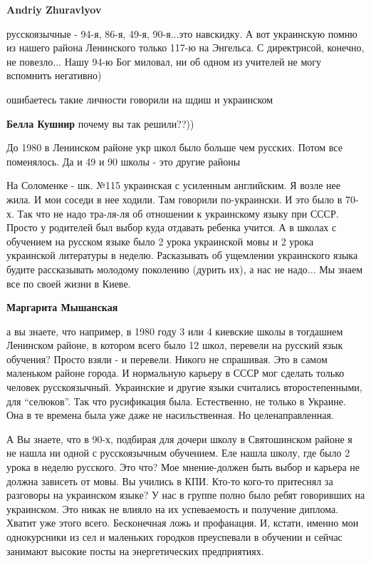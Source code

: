 \begin{itemize}
\begin{itemize}
\begin{itemize}
\textbf{Andriy Zhuravlyov} 

русскоязычные - 94-я, 86-я, 49-я, 90-я...это навскидку. А вот украинскую помню
из нашего района Ленинского только 117-ю на Энгельса. С директрисой, конечно,
не повезло... Нашу 94-ю Бог миловал, ни об одном из учителей не могу вспомнить
негативно)

\end{itemize} %

ошибаетесь такие личности говорили на шдиш и украинском

\textbf{Белла Кушнир} почему вы так решили??))


До 1980 в Ленинском районе укр школ было больше чем русских. Потом все
поменялось. Да и 49 и 90 школы - это другие районы



На Соломенке - шк. №115 украинская с усиленным английским. Я возле нее жила. И мои
соседи в нее ходили. Там говорили по-украински. И это было в 70-х. Так что не надо
тра-ля-ля об отношении к украинскому языку при СССР. Просто у родителей был
выбор куда отдавать ребенка учится. А в школах с обучением на русском языке было
2 урока украинской мовы и 2 урока украинской литературы в неделю. Расказывать об
ущемлении украинского языка будите рассказывать молодому поколению (дурить их), а
нас не надо... Мы знаем все по своей жизни в Киеве.

\begin{itemize} %
\textbf{Маргарита Мышанская} 

а вы знаете, что например, в 1980 году 3 или 4 киевские школы в тогдашнем
Ленинском районе, в котором всего было 12 школ, перевели на русский язык
обучения? Просто взяли - и перевели. Никого не спрашивая. Это в самом маленьком
районе города. И нормальную карьеру в СССР мог сделать только человек
русскоязычный. Украинские и другие языки считались второстепенными, для
\enquote{селюков}. Так что русификация была. Естественно, не только в Украине. Она в те
времена была уже даже не насильственная. Но целенаправленная.

\end{itemize} %


А Вы знаете, что в 90-х, подбирая для дочери школу в Святошинском районе я не
нашла ни одной с русскоязычным обучением. Еле нашла школу, где было 2 урока в
неделю русского. Это что? Мое мнение-должен быть выбор и карьера не должна
зависеть от мовы. Вы учились в КПИ. Кто-то кого-то притеснял за разговоры на
украинском языке? У нас в группе полно было ребят говоривших на украинском. Это
никак не влияло на их успеваемость и получение диплома. Хватит уже этого
всего. Бесконечная ложь и профанация. И, кстати, именно мои однокурсники из сел и
маленьких городков преуспевали в обучении и сейчас занимают высокие посты на
энергетических предприятиях.


\end{itemize}
\end{itemize}
